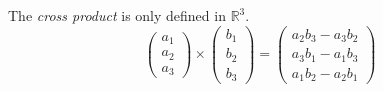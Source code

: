 \begin{multicols}{2}
{        The \textit{cross product} is only defined in $\mathbb{R}^3$.
        \begin{equation*}
            \begin{pmatrix}
                a_1 \\
                a_2 \\
                a_3
            \end{pmatrix}
            \times
            \begin{pmatrix}
                b_1 \\
                b_2 \\
                b_3
            \end{pmatrix}
            =
            \begin{pmatrix}
                a_2 b_3 - a_3 b_2 \\
                a_3 b_1 - a_1 b_3 \\
                a_1 b_2 - a_2 b_1
            \end{pmatrix}
        \end{equation*}

}
\end{multicols}
